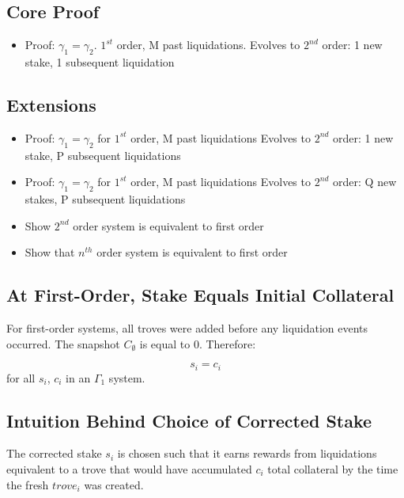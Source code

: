 \documentclass[reqno]{article}
\begin{document}
\subsection*{Core Proof}
\begin{itemize}
  \item Proof: $\gamma_1=\gamma_2$. $1^{st}$ order, M past liquidations. Evolves to $2^{nd}$ order: 1 new stake, 1 subsequent liquidation
\end{itemize}


\subsection*{Extensions}
\begin{itemize}
  \item Proof: $\gamma_1=\gamma_2$ for $1^{st}$ order, M past liquidations Evolves to $2^{nd}$ order: 1 new stake, P subsequent liquidations
  \item Proof: $\gamma_1=\gamma_2$ for $1^{st}$ order, M past liquidations Evolves to $2^{nd}$ order: Q new stakes, P subsequent liquidations
  \item Show $2^{nd}$ order system is equivalent to first order 
  \item Show that $n^{th}$ order system is equivalent to first order
\end{itemize}





\subsection{At First-Order, Stake Equals Initial Collateral}

For first-order systems, all troves were added before any liquidation events occurred. The snapshot $C_\emptyset$ is equal to 0. Therefore:

\begin{equation} 
    s_i=c_i
\end{equation}
for all $s_i$, $c_i$ in an $\Gamma_1$ system.

\subsection{Intuition Behind Choice of Corrected Stake}

The corrected stake $s_i$ is chosen such that it earns rewards from liquidations equivalent to a trove that would have accumulated $c_i$ total collateral by the time the fresh $trove_i$ was created.\\
\end{document}
